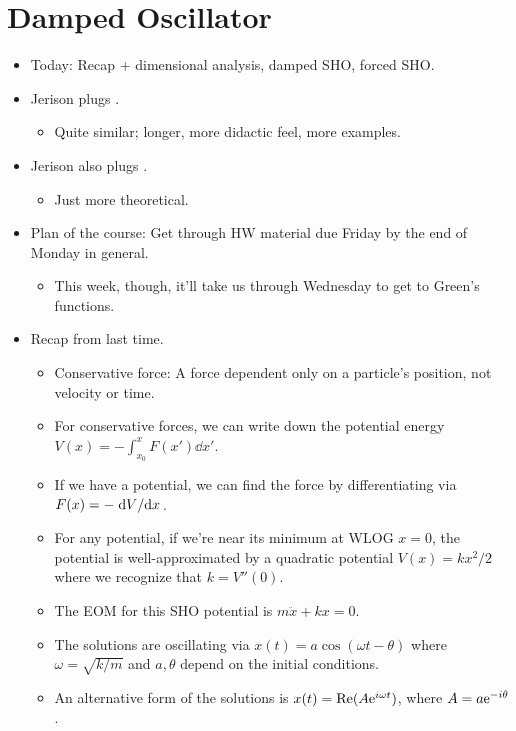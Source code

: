 \documentclass[../notes.tex]{subfiles}
\begin{document}
\section{Damped Oscillator}
\begin{itemize}
    \item {}Today: Recap + dimensional analysis, damped SHO, forced SHO.
    \item Jerison plugs \textcite{bib:ThorntonMarion}.
    \begin{itemize}
        \item Quite similar; longer, more didactic feel, more examples.
    \end{itemize}
    \item Jerison also plugs \textcite{bib:LandauLifshitz}.
    \begin{itemize}
        \item Just more theoretical.
    \end{itemize}
    \item Plan of the course: Get through HW material due Friday by the end of Monday in general.
    \begin{itemize}
        \item This week, though, it'll take us through Wednesday to get to Green's functions.
    \end{itemize}
    \item Recap from last time.
    \begin{itemize}
        \item Conservative force: A force dependent only on a particle's position, not velocity or time.
        \item For conservative forces, we can write down the potential energy $V(x)=-\int_{x_0}^xF(x')\dd{x'}$.
        \item If we have a potential, we can find the force by differentiating via $F(x)=-\dv*{V}{x}$.
        \item For any potential, if we're near its minimum at WLOG $x=0$, the potential is well-approximated by a quadratic potential $V(x)=kx^2/2$ where we recognize that $k=V''(0)$.
        \item The EOM for this SHO potential is $m\ddot{x}+kx=0$.
        \item The solutions are oscillating via $x(t)=a\cos(\omega t-\theta)$ where $\omega=\sqrt{k/m}$ and $a,\theta$ depend on the initial conditions.
        \item An alternative form of the solutions is $x(t)=\re(A\e[i\omega t])$, where $A=a\e[-i\theta]$.

\end{itemize}
\end{itemize}
\end{document}
